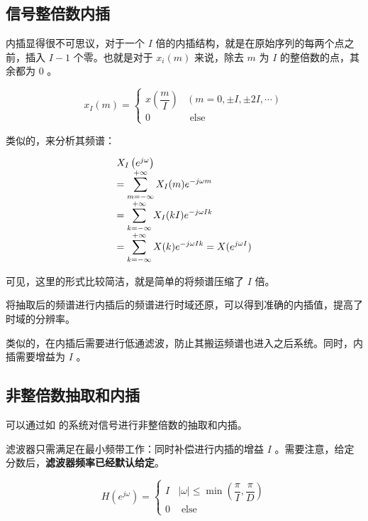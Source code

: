 \documentclass[cn,11pt,chinese,black,simple]{elegantbook}
\begin{document}
\subsection{信号整倍数内插}

内插显得很不可思议，对于一个 \(I\) 倍的内插结构，就是在原始序列的每两个点之前，插入 \(I-1\) 个零。也就是对于 \(x_i(m)\) 来说，除去 \(m\) 为 \(I\) 的整倍数的点，其余都为 \(0\) 。


\[x_{I}(m)=\left\{\begin{array}{cc}
    x\left(\dfrac{m}{I}\right) & (m=0, \pm I, \pm 2 I, \cdots) \\
    0 & \text { else }
\end{array}\right.\]

类似的，来分析其频谱：

\[
\begin{array}{l}
X_{I}\left(e^{j \omega}\right) \\
=\displaystyle\sum_{m=-\infty}^{+\infty} X_{I}(m) e^{-j \omega m} \\
=\displaystyle\sum_{k=-\infty}^{+\infty} X_{I}(k I) e^{-j \omega I k} \\
=\displaystyle\sum_{k=-\infty}^{+\infty} X(k) e^{-j \omega I k}= X(e^{j\omega I})
\end{array}
\]

可见，这里的形式比较简洁，就是简单的将频谱压缩了 \(I\) 倍。

将抽取后的频谱进行内插后的频谱进行时域还原，可以得到准确的内插值，提高了时域的分辨率。

类似的，在内插后需要进行低通滤波，防止其搬运频谱也进入之后系统。同时，内插需要增益为 \(I\) 。



\subsection{非整倍数抽取和内插}

可以通过如  的系统对信号进行非整倍数的抽取和内插。


滤波器只需满足在最小频带工作：同时补偿进行内插的增益 \(I\) 。需要注意，给定分数后，\textbf{滤波器频率已经默认给定}。 

\[
H\left(e^{j \omega}\right)=\left\{\begin{array}{ll}
I & |\omega| \leq \min \left(\dfrac{\pi}{I}, \dfrac{\pi}{D}\right) \\
0 & \text { else }
\end{array}\right.
\]
\end{document}
